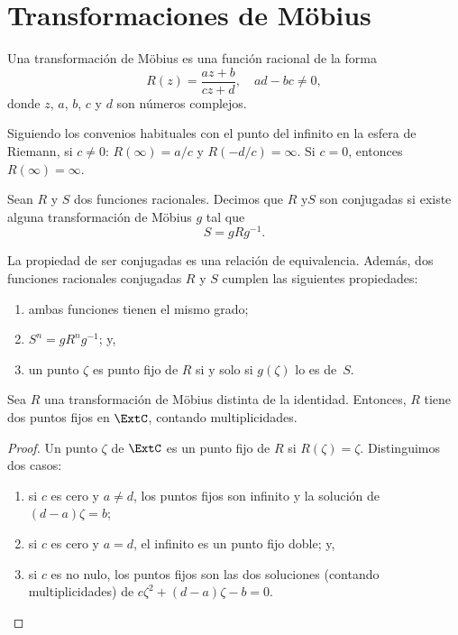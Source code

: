 \section{Transformaciones de Möbius}

\begin{definicion}
  Una transformación de Möbius es una función racional de la forma
  \begin{equation*}
    R(z) = \frac{az + b}{cz + d}, \quad ad-bc \neq 0,
  \end{equation*}
  donde $z$, $a$, $b$, $c$ y $d$ son números complejos.
\end{definicion}

Siguiendo los convenios habituales con el punto del infinito en la esfera de
Riemann, si $c \neq 0$: $R(\infty) = a/c$ y $R(-d/c) = \infty$. Si $c = 0$,
entonces $R(\infty) = \infty$.

\begin{definicion}
  Sean $R$ y $S$ dos funciones racionales. Decimos que $R$ y$S$ son conjugadas
  si existe alguna transformación de Möbius $g$ tal que
  \begin{equation*}
    S = g R g^{-1}.
  \end{equation*}
\end{definicion}

La propiedad de ser conjugadas es una relación de equivalencia. Además, dos
funciones racionales conjugadas $R$ y $S$ cumplen las siguientes propiedades:
\begin{enumerate}[label=(\arabic*)]
  \item ambas funciones tienen el mismo grado;
  \item $S^n = g R^n g^{-1}$; y,
  \item un punto $\zeta$ es punto fijo de $R$ si y solo si $g(\zeta)$ lo es
        de~$S$.
\end{enumerate}

\begin{proposicion}
  Sea $R$ una transformación de Möbius distinta de la identidad. Entonces, $R$
  tiene dos puntos fijos en $\ExtC$, contando multiplicidades.
\end{proposicion}
\begin{proof}
  Un punto $\zeta$ de $\ExtC$ es un punto fijo de $R$ si $R(\zeta) = \zeta$.
  Distinguimos dos casos:
  \begin{enumerate}[label=(\roman*)]
    \item si $c$ es cero y $a \neq d$, los puntos fijos son infinito y la
          solución de $(d-a)\zeta = b$; \label{item:mobius_inf_fijo}
    \item si $c$ es cero y $a = d$, el infinito es un punto fijo doble; y,
          \label{item:mobius_inf_fijo_doble}
    \item si $c$ es no nulo, los puntos fijos son las dos soluciones (contando
          multiplicidades) de $c\zeta^2 + (d - a)\zeta - b = 0$.
  \end{enumerate}
\end{proof}

